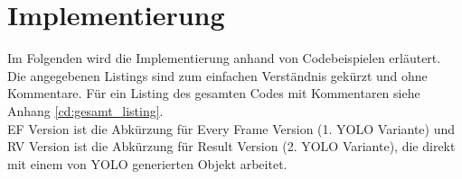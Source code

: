 \chapter{Implementierung} 
\label{ch:implementierung}


{\label{implementation_in_python}} 
Im Folgenden wird die Implementierung anhand von Codebeispielen erläutert. Die angegebenen Listings sind zum einfachen Verständnis gekürzt und ohne Kommentare. Für ein Listing des gesamten Codes mit Kommentaren siehe Anhang \ref{cd:gesamt_listing}. \\
EF Version ist die Abkürzung für \glqq Every Frame\grqq{} Version (1. YOLO Variante) und RV Version ist die Abkürzung für \glqq Result\grqq{} Version (2. YOLO Variante), die direkt mit einem von YOLO generierten Objekt arbeitet. 
